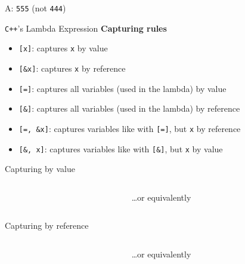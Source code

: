 \addtocounter{framenumber}{-1}
\begin{frame}[fragile]{A: \texttt{555} (not \texttt{444})}
\end{frame}

\begin{frame}[fragile]{\texttt{C++}'s Lambda Expression}
    \textbf{Capturing rules}
    \begin{itemize}
        \item \texttt{[x]}: captures \texttt{x} by value
        \item \texttt{[\&x]}: captures \texttt{x} by reference
        \item \texttt{[=]}: captures all variables (used in the lambda) by value
        \item \texttt{[\&]}: captures all variables (used in the lambda) by reference
        \item \texttt{[=, \&x]}: captures variables like with \texttt{[=]}, but \texttt{x} by reference
        \item \texttt{[\&, x]}: captures variables like with \texttt{[\&]}, but \texttt{x} by value
    \end{itemize}
\end{frame}

\begin{frame}[fragile]{Capturing by value}
    \begin{columns}[t]
        \begin{column}{.45\textwidth}
        \end{column}
        \begin{column}{.45\textwidth}
            \ldots or equivalently
        \end{column}
    \end{columns}
\end{frame}

\begin{frame}[fragile]{Capturing by reference}
    \begin{columns}[t]
        \begin{column}{.45\textwidth}
        \end{column}
        \begin{column}{.45\textwidth}
            \ldots or equivalently
        \end{column}
    \end{columns}
\end{frame}

